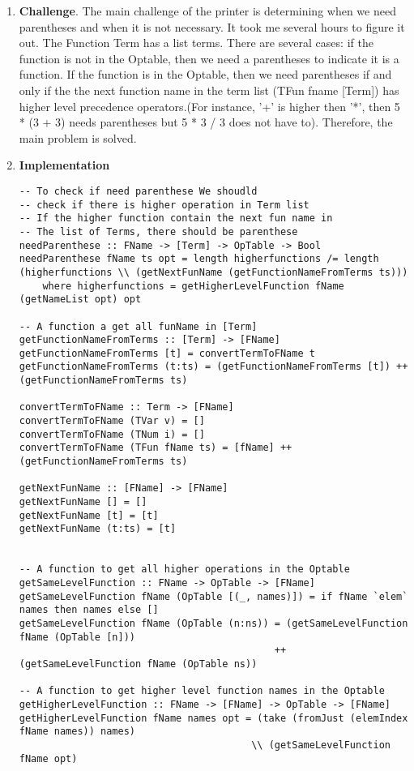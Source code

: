 \documentclass[11pt]{article}
\begin{document}
\begin{enumerate}
\item \textbf{Challenge}. The main challenge of the printer is determining when we need parentheses and when it is not necessary. It took me several hours to figure it out. The Function Term has a list terms. There are several cases: if the function is not in the Optable, then we need a parentheses to indicate it is a function. If the function is in the Optable, then we need parentheses if and only if the the next function name in the term list (TFun fname [Term]) has higher level precedence operators.(For instance, '+' is higher then '*', then 5 * (3 + 3) needs parentheses but 5 * 3 / 3 does not have to). Therefore, the main problem is solved. 

\item \textbf{Implementation}
\begin{lstlisting}
-- To check if need parenthese We shoudld 
-- check if there is higher operation in Term list
-- If the higher function contain the next fun name in 
-- The list of Terms, there should be parenthese
needParenthese :: FName -> [Term] -> OpTable -> Bool
needParenthese fName ts opt = length higherfunctions /= length (higherfunctions \\ (getNextFunName (getFunctionNameFromTerms ts)))
    where higherfunctions = getHigherLevelFunction fName (getNameList opt) opt

-- A function a get all funName in [Term]
getFunctionNameFromTerms :: [Term] -> [FName]
getFunctionNameFromTerms [t] = convertTermToFName t
getFunctionNameFromTerms (t:ts) = (getFunctionNameFromTerms [t]) ++ (getFunctionNameFromTerms ts)

convertTermToFName :: Term -> [FName]
convertTermToFName (TVar v) = []
convertTermToFName (TNum i) = []
convertTermToFName (TFun fName ts) = [fName] ++ (getFunctionNameFromTerms ts)

getNextFunName :: [FName] -> [FName]
getNextFunName [] = []
getNextFunName [t] = [t]
getNextFunName (t:ts) = [t]


-- A function to get all higher operations in the Optable
getSameLevelFunction :: FName -> OpTable -> [FName]
getSameLevelFunction fName (OpTable [(_, names)]) = if fName `elem` names then names else []
getSameLevelFunction fName (OpTable (n:ns)) = (getSameLevelFunction fName (OpTable [n])) 
                                            ++ (getSameLevelFunction fName (OpTable ns)) 

-- A function to get higher level function names in the Optable 
getHigherLevelFunction :: FName -> [FName] -> OpTable -> [FName]
getHigherLevelFunction fName names opt = (take (fromJust (elemIndex fName names)) names) 
                                        \\ (getSameLevelFunction fName opt)
\end{lstlisting}


\end{enumerate}
\end{document}
